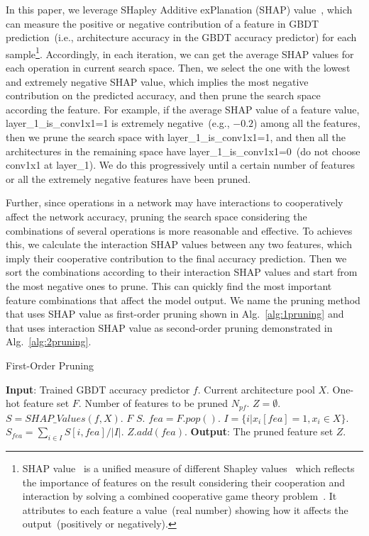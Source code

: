 \documentclass{article}
\begin{document}
In this paper, we leverage SHapley Additive exPlanation (SHAP) value~\cite{unifiedshap}, which can measure the positive or negative contribution of a feature in GBDT prediction~(i.e., architecture accuracy in the GBDT accuracy predictor) for each sample\footnote{SHAP value~\cite{unifiedshap} is a unified measure of different Shapley values~\cite{shapleyregression,shapleysampling,quantinputinfluence} which reflects the importance of features on the result considering their cooperation and interaction by solving a combined cooperative game theory problem~\cite{shapleyvalue}. It attributes to each feature a value~(real number) showing how it affects the output~(positively or negatively).}. Accordingly, in each iteration, we can get the average SHAP values for each operation in current search space. Then, we select the one with the lowest and extremely negative SHAP value, which implies the most negative contribution on the predicted accuracy, and then prune the search space according the feature. For example, if the average SHAP value of a feature value, layer\_1\_is\_conv1x1=1 is extremely negative~(e.g., $-0.2$) among all the features, then we prune the search space with layer\_1\_is\_conv1x1=1, and then all the architectures in the remaining space have layer\_1\_is\_conv1x1=0~(do not choose conv1x1 at layer\_1). We do this progressively until a certain number of features or all the extremely negative features have been pruned.

Further, since operations in a network may have interactions to cooperatively affect the network accuracy, pruning the search space considering the combinations of several operations is more reasonable and effective. To achieves this, we calculate the interaction SHAP values between any two features, which imply their cooperative contribution to the final accuracy prediction. Then we sort the combinations according to their interaction SHAP values and start from the most negative ones to prune. This can quickly find the most important feature combinations that affect the model output. We name the pruning method that uses SHAP value as first-order pruning shown in Alg.~\ref{alg:1pruning} and that uses interaction SHAP value as second-order pruning demonstrated in Alg.~\ref{alg:2pruning}.

\begin{algorithm}[ht]
\small
\caption{First-Order Pruning}
\label{alg:1pruning}
\begin{algorithmic}[1]
\STATE \textbf{Input}: Trained GBDT accuracy predictor $f$. Current architecture pool $X$. One-hot feature set $F$. Number of features to be pruned $N_{pf}$.
\STATE $Z=\emptyset$.
\STATE $S = SHAP\_Values(f, X)$.
\STATE {} $F$  $S$.
\STATE $fea=F.pop()$.
\STATE $I = \{i|x_i[fea] = 1, x_i \in X\}$.
\STATE $S_{fea} = \sum_{i\in I}S[i,fea] / |I|$.
\STATE $Z.add(fea)$.
\ENDIF
\ENDFOR
\STATE \textbf{Output}: The pruned feature set $Z$.
\end{algorithmic}
\end{algorithm}
\end{document}
